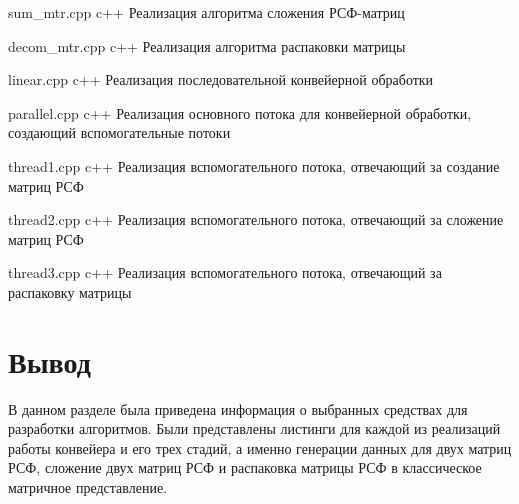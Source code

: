 \newpage 

{sum_mtr.cpp}
{c++}
{Реализация алгоритма сложения РСФ-матриц}

\newpage 

{decom_mtr.cpp}
{c++}
{Реализация алгоритма распаковки матрицы}

\newpage 

{linear.cpp}
{c++}
{Реализация последовательной конвейерной обработки}

\newpage 

{parallel.cpp}
{c++}
{Реализация основного потока для конвейерной обработки, создающий вспомогательные потоки}

\newpage 

{thread1.cpp}
{c++}
{Реализация вспомогательного потока, отвечающий за создание матриц РСФ}

\newpage 

{thread2.cpp}
{c++}
{Реализация вспомогательного потока, отвечающий за сложение матриц РСФ}

\newpage 

{thread3.cpp}
{c++}
{Реализация вспомогательного потока, отвечающий за распаковку матрицы}

\section*{Вывод}
В данном разделе была приведена информация о выбранных средствах для разработки алгоритмов. 
Были представлены листинги для каждой из реализаций работы конвейера и его трех стадий, а именно генерации данных для двух матриц РСФ, сложение двух матриц РСФ и распаковка матрицы РСФ в классическое матричное представление.
